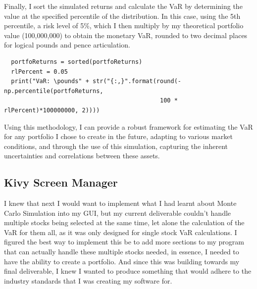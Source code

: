 \documentclass{article}
\begin{document}
\vspace{0.3cm}
Finally, I sort the simulated returns and calculate the VaR by determining the value at the specified percentile of the distribution. In this case, using the 5th percentile, a risk level of 5\%, which I then multiply by my theoretical portfolio value (100,000,000) to obtain the monetary VaR, rounded to two decimal places for logical pounds and pence articulation.\\\vspace{0.3cm}

\begin{verbatim}
  portfoReturns = sorted(portfoReturns)
  rlPercent = 0.05
  print("VaR: \pounds" + str("{:,}".format(round(-np.percentile(portfoReturns, 
                                            100 * rlPercent)*100000000, 2))))
\end{verbatim}

\vspace{0.3cm}
Using this methodology, I can provide a robust framework for estimating the VaR for any portfolio I chose to create in the future, adapting to various market conditions, and through the use of this simulation, capturing the inherent uncertainties and correlations between these assets.


\subsection{Kivy Screen Manager}
I knew that next I would want to implement what I had learnt about Monte Carlo Simulation into my GUI, but my current deliverable couldn't handle multiple stocks being selected at the same time, let alone the calculation of the VaR for them all, as it was only designed for single stock VaR calculations. I figured the best way to implement this be to add more sections to my program that can actually handle these multiple stocks needed, in essence, I needed to have the ability to create a portfolio. And since this was building towards my final deliverable, I knew I wanted to produce something that would adhere to the industry standards that I was creating my software for.\\\vspace{0.3cm}
\end{document}
